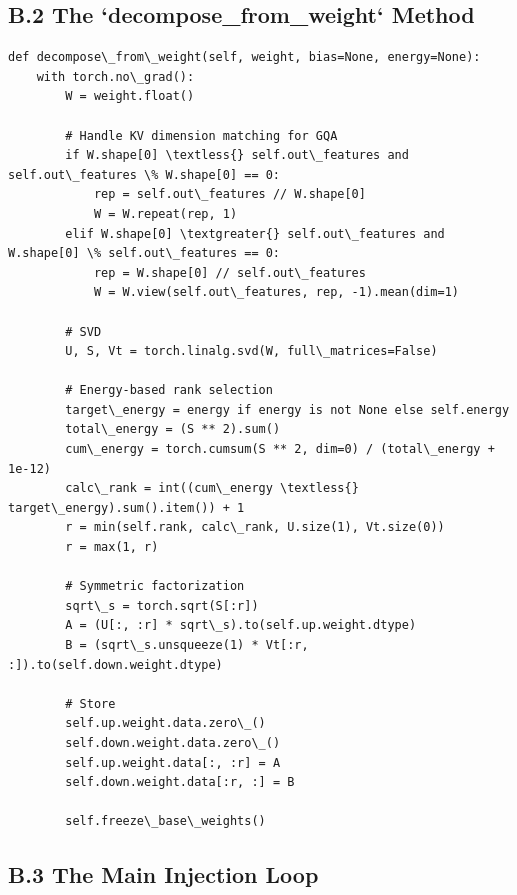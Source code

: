 \subsection{B.2 The `decompose\_from\_weight` Method}

\begin{lstlisting}
def decompose\_from\_weight(self, weight, bias=None, energy=None):
    with torch.no\_grad():
        W = weight.float()
        
        # Handle KV dimension matching for GQA
        if W.shape[0] \textless{} self.out\_features and self.out\_features \% W.shape[0] == 0:
            rep = self.out\_features // W.shape[0]
            W = W.repeat(rep, 1)
        elif W.shape[0] \textgreater{} self.out\_features and W.shape[0] \% self.out\_features == 0:
            rep = W.shape[0] // self.out\_features
            W = W.view(self.out\_features, rep, -1).mean(dim=1)
        
        # SVD
        U, S, Vt = torch.linalg.svd(W, full\_matrices=False)
        
        # Energy-based rank selection
        target\_energy = energy if energy is not None else self.energy
        total\_energy = (S ** 2).sum()
        cum\_energy = torch.cumsum(S ** 2, dim=0) / (total\_energy + 1e-12)
        calc\_rank = int((cum\_energy \textless{} target\_energy).sum().item()) + 1
        r = min(self.rank, calc\_rank, U.size(1), Vt.size(0))
        r = max(1, r)
        
        # Symmetric factorization
        sqrt\_s = torch.sqrt(S[:r])
        A = (U[:, :r] * sqrt\_s).to(self.up.weight.dtype)
        B = (sqrt\_s.unsqueeze(1) * Vt[:r, :]).to(self.down.weight.dtype)
        
        # Store
        self.up.weight.data.zero\_()
        self.down.weight.data.zero\_()
        self.up.weight.data[:, :r] = A
        self.down.weight.data[:r, :] = B
        
        self.freeze\_base\_weights()
\end{lstlisting}

\subsection{B.3 The Main Injection Loop}

